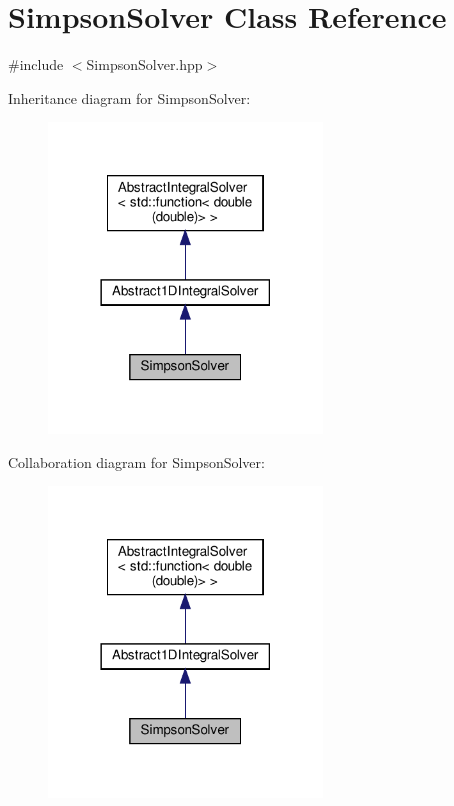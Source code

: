 \hypertarget{class_simpson_solver}{}\section{Simpson\+Solver Class Reference}
\label{class_simpson_solver}


{\ttfamily \#include $<$Simpson\+Solver.\+hpp$>$}



Inheritance diagram for Simpson\+Solver\+:\nopagebreak
\begin{figure}[H]
\begin{center}
\leavevmode
\includegraphics[width=206pt]{class_simpson_solver__inherit__graph}
\end{center}
\end{figure}


Collaboration diagram for Simpson\+Solver\+:\nopagebreak
\begin{figure}[H]
\begin{center}
\leavevmode
\includegraphics[width=206pt]{class_simpson_solver__coll__graph}
\end{center}
\end{figure}

